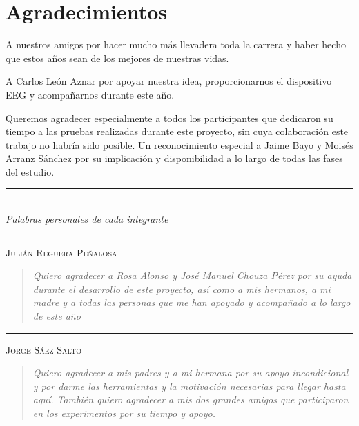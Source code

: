 
\chapter*{Agradecimientos}

A nuestros amigos por hacer mucho más llevadera toda la carrera y haber hecho que estos años sean de los mejores de nuestras vidas.

A Carlos León Aznar por apoyar nuestra idea, proporcionarnos el dispositivo EEG y acompañarnos durante este año.

Queremos agradecer especialmente a todos los participantes que dedicaron su tiempo a las pruebas realizadas durante este proyecto,
sin cuya colaboración este trabajo no habría sido posible.
Un reconocimiento especial a Jaime Bayo y Moisés Arranz Sánchez
por su implicación y disponibilidad a lo largo de todas las fases del estudio.

\bigskip

\begin{center}
    \rule{0.5\textwidth}{0.6pt}\\[0.4em]
    {\small\itshape Palabras personales de cada integrante}\\[0.4em]
    \rule{0.5\textwidth}{0.6pt}
\end{center}

\bigskip

\noindent\textsc{Julián Reguera Peñalosa} \hfill \\[0.3em]
\begin{quotation}
\noindent\itshape
Quiero agradecer a Rosa Alonso y José Manuel Chouza Pérez por su ayuda durante el desarrollo de este proyecto, así como a mis hermanos, a mi madre y a todas las personas que me han apoyado y acompañado a lo largo de este año
\end{quotation}

\medskip
\noindent\rule{\textwidth}{0.2pt}
\medskip

\noindent\textsc{Jorge Sáez Salto} \hfill \\[0.3em]
\begin{quotation}
\noindent\itshape
Quiero agradecer a mis padres y a mi hermana por su apoyo incondicional y por darme las herramientas y la motivación necesarias para llegar hasta aquí. También quiero agradecer a mis dos grandes amigos que participaron en los experimentos por su tiempo y apoyo.
\end{quotation}

